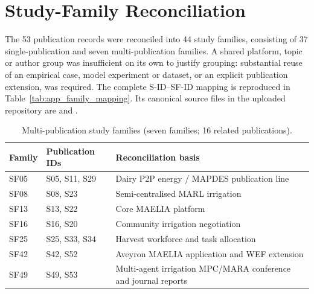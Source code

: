\section{Study-Family Reconciliation}
\label{app:families}
The 53 publication records were reconciled into 44 study families, consisting of 37 single-publication and seven multi-publication families. A shared platform, topic or author group was insufficient on its own to justify grouping: substantial reuse of an empirical case, model experiment or dataset, or an explicit publication extension, was required. The complete S-ID--SF-ID mapping is reproduced in Table~\ref{tab:app_family_mapping}. Its canonical source files in the uploaded repository are  and .
\begin{table}[htbp]\centering\small
\caption{Multi-publication study families (seven families; 16 related publications).}\label{tab:app_multifamilies}
\begin{tabularx}{\textwidth}{@{}llX@{}}\toprule Family & Publication IDs & Reconciliation basis \\\midrule
SF05 & S05, S11, S29 & Dairy P2P energy / MAPDES publication line\\
SF08 & S08, S23 & Semi-centralised MARL irrigation\\
SF13 & S13, S22 & Core MAELIA platform\\
SF16 & S16, S20 & Community irrigation negotiation\\
SF25 & S25, S33, S34 & Harvest workforce and task allocation\\
SF42 & S42, S52 & Aveyron MAELIA application and WEF extension\\
SF49 & S49, S53 & Multi-agent irrigation MPC/MARA conference and journal reports\\
\bottomrule\end{tabularx}\end{table}
\begingroup\footnotesize
